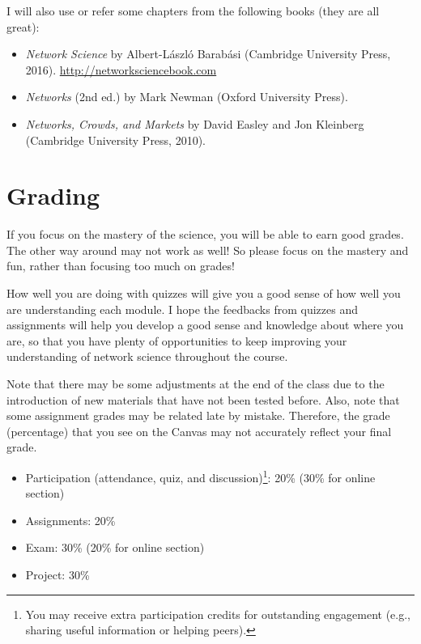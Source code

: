 \documentclass[11pt,article,oneside]{memoir} %
\begin{document}
I will also use or refer some chapters from the following books (they are all great):
\begin{itemize}\vspace{-10pt}
  \item \emph{Network Science} by Albert-László Barabási (Cambridge University Press, 2016). \url{http://networksciencebook.com}
  \item \emph{Networks} (2nd ed.) by Mark Newman (Oxford University Press).
  \item \emph{Networks, Crowds, and Markets} by David Easley and Jon Kleinberg (Cambridge University Press, 2010).
\end{itemize}

\section{Grading}\label{sec:grading_tentative} %

If you focus on the mastery of the science, you will be able to earn good grades. The other way around may not work as well! So please focus on the mastery and fun, rather than focusing too much on grades! 

How well you are doing with quizzes will give you a good sense of how well you are understanding each module. I hope the feedbacks from quizzes and assignments will help you develop a good sense and knowledge about where you are, so that you have plenty of opportunities to keep improving your understanding of network science throughout the course. 

Note that there may be some adjustments at the end of the class due to the introduction of new materials that have not been tested before. Also, note that some assignment grades may be related late by mistake. Therefore, the grade (percentage) that you see on the Canvas may not accurately reflect your final grade.

\vspace{-10pt}
\begin{itemize}\itemsep=0pt

\item Participation (attendance, quiz, and discussion)\footnote{You may receive extra participation credits for outstanding engagement (e.g., sharing useful information or helping peers).}: 20\%  (30\% for online section)

\item Assignments: 20\%

\item Exam: 30\% (20\% for online section)

\item Project: 30\%

\end{itemize}
\end{document}

